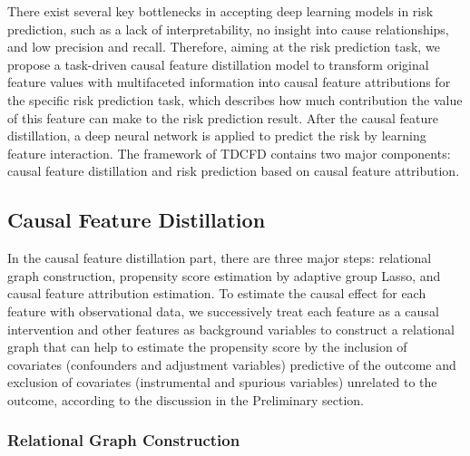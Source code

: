 \documentclass[letterpaper]{article} %
\theoremstyle{definition}
\theoremstyle{remark}
\begin{document}
There exist several key bottlenecks in accepting deep learning models in risk prediction, such as a lack of interpretability, no insight into cause relationships, and low precision and recall. Therefore, aiming at the risk prediction task, we propose a task-driven causal feature distillation model to transform original feature values with multifaceted information into causal feature attributions for the specific risk prediction task, which describes how much contribution the value of this feature can make to the risk prediction result. After the causal feature distillation, a deep neural network is applied to predict the risk by learning feature interaction. The framework of TDCFD contains two major components: causal feature distillation and risk prediction based on causal feature attribution.


\subsection{Causal Feature Distillation}
\label{black_box}

In the causal feature distillation part, there are three major steps: relational graph construction, propensity score estimation by adaptive group Lasso, and causal feature attribution estimation. To estimate the causal effect for each feature with observational data, we successively treat each feature as a causal intervention and other features as background variables to construct a relational graph that can help to estimate the propensity score by the inclusion of covariates (confounders and adjustment variables) predictive of the outcome and exclusion of covariates (instrumental and spurious variables) unrelated to the outcome, according to the discussion in the Preliminary section.


\subsubsection{Relational Graph Construction}
\label{prediction}
\end{document}
